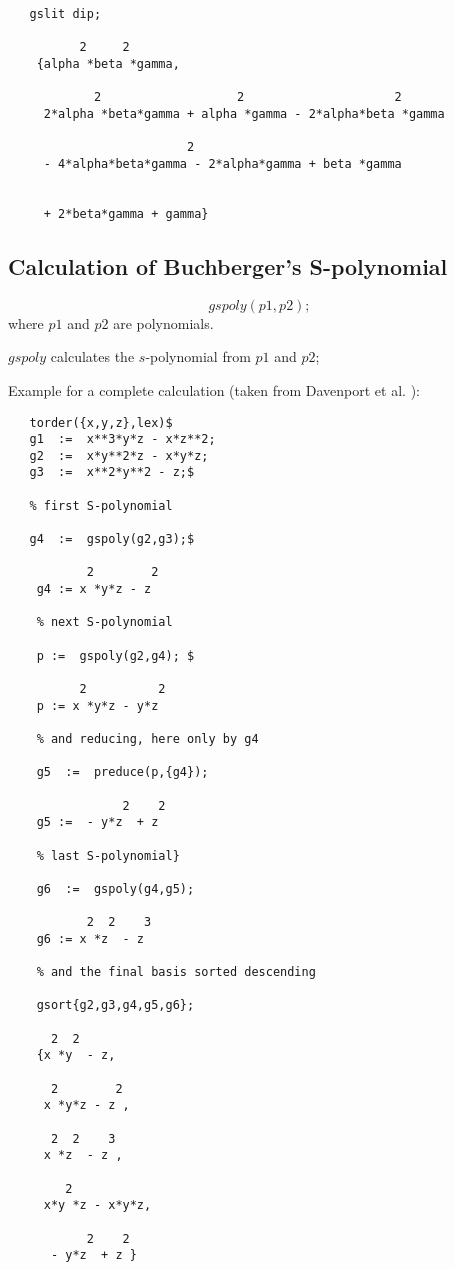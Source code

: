 \begin{verbatim}
   gslit dip;

          2     2
    {alpha *beta *gamma,

            2                   2                     2
     2*alpha *beta*gamma + alpha *gamma - 2*alpha*beta *gamma

                         2
     - 4*alpha*beta*gamma - 2*alpha*gamma + beta *gamma


     + 2*beta*gamma + gamma}

 \end{verbatim}

\subsection{Calculation of Buchberger's S-polynomial}
\[ gspoly (p1,p2); \]
where $p1$  and $p2$ are polynomials.

$gspoly$ calculates the $s$-polynomial from $p1$  and $p2$;

Example for a complete calculation (taken from {\sc Davenport et al.}
 \cite{Davenport:88a}):
\begin{verbatim}
   torder({x,y,z},lex)$
   g1  :=  x**3*y*z - x*z**2;
   g2  :=  x*y**2*z - x*y*z;
   g3  :=  x**2*y**2 - z;$

   % first S-polynomial

   g4  :=  gspoly(g2,g3);$

           2        2
    g4 := x *y*z - z

    % next S-polynomial

    p :=  gspoly(g2,g4); $

          2          2
    p := x *y*z - y*z

    % and reducing, here only by g4

    g5  :=  preduce(p,{g4});

                2    2
    g5 :=  - y*z  + z

    % last S-polynomial}

    g6  :=  gspoly(g4,g5);

           2  2    3
    g6 := x *z  - z

    % and the final basis sorted descending

    gsort{g2,g3,g4,g5,g6};

      2  2
    {x *y  - z,

      2        2
     x *y*z - z ,

      2  2    3
     x *z  - z ,

        2
     x*y *z - x*y*z,

           2    2
      - y*z  + z }
 \end{verbatim}





